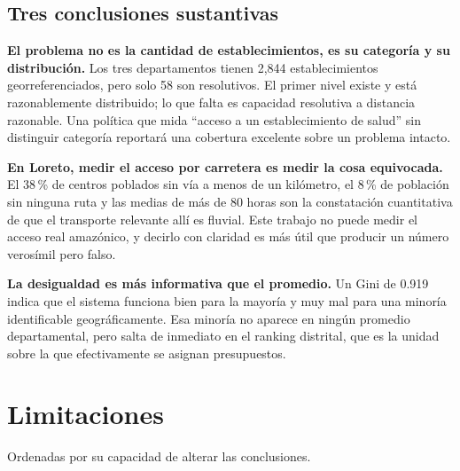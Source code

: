 \documentclass[11pt,a4paper]{article}
\begin{document}
\subsection{Tres conclusiones sustantivas}

\textbf{El problema no es la cantidad de establecimientos, es su categoría y
su distribución.} Los tres departamentos tienen 2{,}844 establecimientos
georreferenciados, pero solo 58 son resolutivos. El primer nivel existe y está
razonablemente distribuido; lo que falta es capacidad resolutiva a distancia
razonable. Una política que mida ``acceso a un establecimiento de salud'' sin
distinguir categoría reportará una cobertura excelente sobre un problema
intacto.

\textbf{En Loreto, medir el acceso por carretera es medir la cosa
equivocada.} El 38\,\% de centros poblados sin vía a menos de un kilómetro, el
8\,\% de población sin ninguna ruta y las medias de más de 80 horas son la
constatación cuantitativa de que el transporte relevante allí es fluvial. Este
trabajo no puede medir el acceso real amazónico, y decirlo con claridad es más
útil que producir un número verosímil pero falso.

\textbf{La desigualdad es más informativa que el promedio.} Un Gini de 0.919
indica que el sistema funciona bien para la mayoría y muy mal para una minoría
identificable geográficamente. Esa minoría no aparece en ningún promedio
departamental, pero salta de inmediato en el ranking distrital, que es la
unidad sobre la que efectivamente se asignan presupuestos.

\section{Limitaciones}

Ordenadas por su capacidad de alterar las conclusiones.
\end{document}
